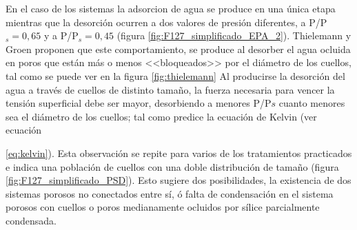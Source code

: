 			En el caso de los sistemas \pdmF\space la adsorcion de agua se produce en una única etapa mientras que la desorción ocurren a dos valores de presión diferentes, a P/P$_s=0,65$ y a P/P$_s=0,45$ (figura \ref{fig:F127_simplificado_EPA_2}). Thielemann \cite{Thielemann2011} y Groen\cite{Groen2003} proponen que este comportamiento, se produce al desorber el agua ocluida en poros que están más o menos <<bloqueados>> por el diámetro de los cuellos, tal como se puede ver en la figura \ref{fig:thielemann} Al producirse la desorción del agua a través de cuellos de distinto tamaño, la fuerza  necesaria para vencer la tensión superficial debe ser mayor, desorbiendo a menores P/P$s$ cuanto menores sea el diámetro de los cuellos; tal como predice la ecuación de Kelvin (ver ecuación {\ref{eq:kelvin}). Esta observación se repite para varios de los tratamientos practicados e indica una población de cuellos con una doble distribución de tamaño (figura \ref{fig:F127_simplificado_PSD}). Esto sugiere dos posibilidades, la existencia de dos sistemas porosos no conectados entre sí, ó falta de condensación en el sistema porosos con cuellos o poros medianamente ocluidos por sílice parcialmente condensada.

}

